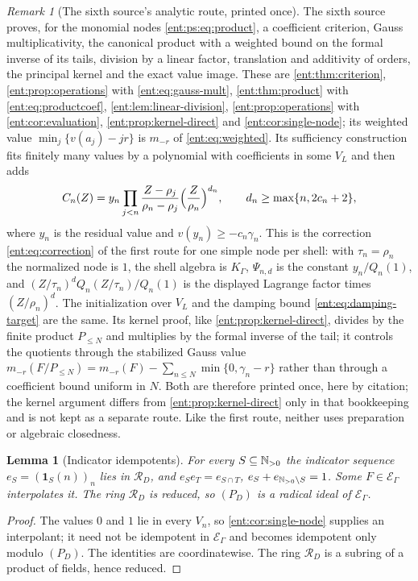 \documentclass[11pt]{article}
\theoremstyle{plain}
\newtheorem{lemma}[lemma]{Lemma}
\theoremstyle{plain}
\theoremstyle{plain}
\theoremstyle{definition}
\theoremstyle{definition}
\theoremstyle{definition}
\theoremstyle{definition}
\theoremstyle{remark}
\newtheorem{remark}[remark]{Remark}
\newcommand{\RD}{\mathcal R_D}\newcommand{\Ucal}{\mathcal U}
\begin{document}
\begin{remark}[The sixth source's analytic route, printed once]
\label{ent:ps:rem:route}
The sixth source proves, for the monomial nodes \eqref{ent:ps:eq:product}, a
coefficient criterion, Gauss multiplicativity, the canonical product with a
weighted bound on the formal inverse of its tails, division by a linear
factor, translation and additivity of orders, the principal kernel and the
exact value image. These are \cref{ent:thm:criterion},
\cref{ent:prop:operations} with \eqref{ent:eq:gauss-mult},
\cref{ent:thm:product} with \eqref{ent:eq:productcoef},
\cref{ent:lem:linear-division}, \cref{ent:prop:operations} with
\cref{ent:cor:evaluation}, \cref{ent:prop:kernel-direct} and
\cref{ent:cor:single-node}; its weighted value
$\min_j\{v(a_j)-jr\}$ is $m_{-r}$ of \eqref{ent:eq:weighted}. Its sufficiency
construction fits finitely many values by a polynomial with coefficients in
some $V_L$ and then adds
\[
 C_n(Z)=y_n\prod_{j<n}\frac{Z-\rho_j}{\rho_n-\rho_j}\Bigl(\frac
 Z{\rho_n}\Bigr)^{d_n},\qquad d_n\ge\max\{n,2c_n+2\},
\]
where $y_n$ is the residual value and $v(y_n)\ge-c_n\gamma_n$. This is the
correction \eqref{ent:eq:correction} of the first route for one simple node
per shell: with $\tau_n=\rho_n$ the normalized node is $1$, the shell algebra
is $K_\Gamma$, $\Psi_{n,d}$ is the constant $y_n/Q_n(1)$, and
$(Z/\tau_n)^dQ_n(Z/\tau_n)/Q_n(1)$ is the displayed Lagrange factor times
$(Z/\rho_n)^d$. The initialization over $V_L$ and the damping bound
\eqref{ent:eq:damping-target} are the same. Its kernel proof, like
\cref{ent:prop:kernel-direct}, divides by the finite product $P_{\le N}$ and
multiplies by the formal inverse of the tail; it controls the quotients
through the stabilized Gauss value
$m_{-r}(F/P_{\le N})=m_{-r}(F)-\sum_{n\le N}\min\{0,\gamma_n-r\}$ rather than
through a coefficient bound uniform in $N$. Both are therefore printed once,
here by citation; the kernel argument differs from
\cref{ent:prop:kernel-direct} only in that bookkeeping and is not kept as a
separate route. Like the first route, neither uses preparation or algebraic
closedness.
\end{remark}

\begin{lemma}[Indicator idempotents]\label{ent:ps:lem:idempotents}
For every $S\subseteq\mathbb N_{>0}$ the indicator sequence
$e_S=(\mathbf 1_S(n))_n$ lies in $\RD$, and
$e_Se_T=e_{S\cap T}$, $e_S+e_{\mathbb N_{>0}\setminus S}=1$. Some $F\in\mathcal
E_\Gamma$ interpolates it. The ring $\RD$ is reduced, so $(P_D)$ is a radical
ideal of $\mathcal E_\Gamma$.
\end{lemma}
\begin{proof}
The values $0$ and $1$ lie in every $V_n$, so \cref{ent:cor:single-node}
supplies an interpolant; it need not be idempotent in $\mathcal E_\Gamma$ and
becomes idempotent only modulo $(P_D)$. The identities are coordinatewise.
The ring $\RD$ is a subring of a product of fields, hence reduced.
\end{proof}
\end{document}
